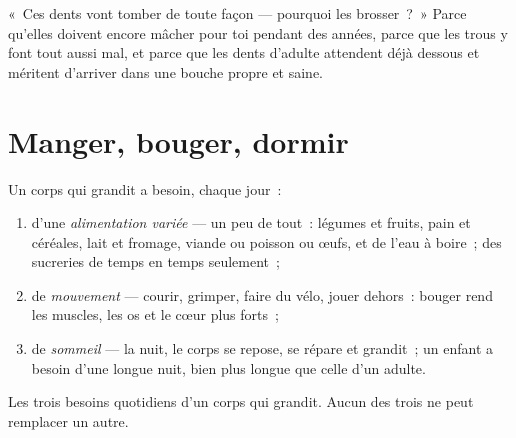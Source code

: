 \begin{remark}\label{rem:g1:healthy-habits:babyteeth}
«~Ces dents vont tomber de toute façon --- pourquoi les brosser~?~»
Parce qu'elles doivent encore mâcher pour toi pendant des années,
parce que les trous y font tout aussi mal, et parce que les dents
d'adulte attendent déjà dessous et méritent d'arriver dans une
bouche propre et saine.
\end{remark}

\section{Manger, bouger, dormir}

\begin{proposition}\label{prop:g1:healthy-habits:needs}
Un corps qui grandit a besoin, chaque jour~:
\begin{enumerate}
  \item d'une \emph{alimentation variée}
        --- un peu de tout~: légumes et fruits, pain et céréales,
        lait et fromage, viande ou poisson ou œufs, et de l'eau à
        boire~; des sucreries de temps en temps seulement~;
  \item de \emph{mouvement} --- courir, grimper,
        faire du vélo, jouer dehors~: bouger rend les muscles, les
        os et le cœur plus forts~;
  \item de \emph{sommeil} --- la nuit, le corps se
        repose, se répare et grandit~; un enfant a besoin d'une
        longue nuit, bien plus longue que celle d'un adulte.
\end{enumerate}
\end{proposition}
\admitted

\begin{omfigure}

{\small Les trois besoins quotidiens d'un corps qui grandit. Aucun
des trois ne peut remplacer un autre.}
\end{omfigure}

